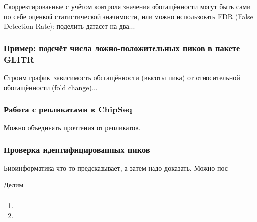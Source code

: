\documentclass[main.tex]{subfiles}
\begin{document}
Скорректированные с учётом контроля значения обогащённости могут быть сами по себе оценкой статистической значимости, или можно использовать FDR (False Detection Rate): поделить датасет на два... %

\subsubsection{Пример: подсчёт числа ложно-положительных пиков в пакете GLITR}

Строим график: зависимость обогащённости (высоты пика) от относительной обогащённости (fold change)...

\subsubsection{Работа с репликатами в ChipSeq}

Можно объединять прочтения от репликатов.

\subsubsection{ Проверка идентифицированных пиков }

Биоинформатика что-то предсказывает, а затем надо доказать.
Можно пос


Делим

\subsubsection{}

\begin{enumerate}[noitemsep]
    \item
    \item
\end{enumerate}
\end{document}

